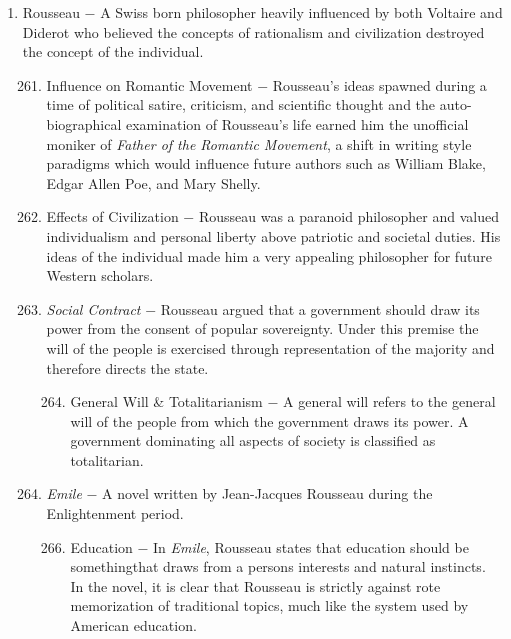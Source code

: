 \documentclass[12pt]{article}
\begin{document}
\begin{enumerate}
\begin{enumerate}[label=\arabic{*}.]
\end{enumerate}
\setcounter{enumi}{259}

\item Rousseau $-$ A Swiss born philosopher heavily influenced by both Voltaire and Diderot who believed the concepts of rationalism and civilization destroyed the concept of the individual.

\begin{enumerate}[label=\arabic{*}.]
\setcounter{enumii}{260}

\item Influence on Romantic Movement $-$ Rousseau's ideas spawned during a time of political satire, criticism, and scientific thought and the auto-biographical examination of Rousseau's life earned him the unofficial moniker of \textit{Father of the Romantic Movement}, a shift in writing style paradigms which would influence future authors such as William Blake, Edgar Allen Poe, and Mary Shelly.

\item Effects of Civilization $-$ Rousseau was a paranoid philosopher and valued individualism and personal liberty above patriotic and societal duties. His ideas of the individual made him a very appealing philosopher for future Western scholars.

\item \textit{Social Contract} $-$ Rousseau argued that a government should draw its power from the consent of popular sovereignty. Under this premise the will of the people is exercised through representation of the majority and therefore directs the state.

\begin{enumerate}[label=\arabic{*}.]
\setcounter{enumiii}{263}

\item General Will \& Totalitarianism $-$ A general will refers to the general will of the people from which the government draws its power. A government dominating all aspects of society is classified as totalitarian.

\end{enumerate}
\setcounter{enumii}{264}

\item \textit{Emile} $-$ A novel written by Jean-Jacques Rousseau during the Enlightenment period.

\begin{enumerate}[label=\arabic{*}.]
\setcounter{enumiii}{265}

\item Education $-$ In \textit{Emile}, Rousseau states that education should be somethingthat draws from a persons interests and natural instincts. In the novel, it is clear that Rousseau is strictly against rote memorization of traditional topics, much like the system used by American education.


\end{enumerate}
\end{enumerate}
\end{enumerate}
\end{document}

